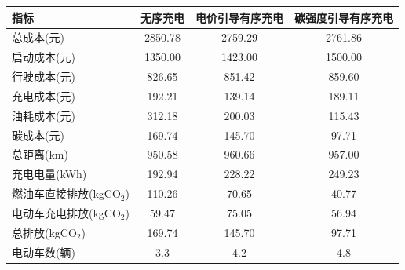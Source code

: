   \begin{tabular*}{\textwidth}{@{\extracolsep{\fill}}lccc@{}}
    \toprule
    指标 & 无序充电 & 电价引导有序充电 & 碳强度引导有序充电\\
    \midrule
    总成本(元) & 2850.78 & 2759.29 & 2761.86\\
    启动成本(元) & 1350.00 & 1423.00 & 1500.00\\
    行驶成本(元) & 826.65 & 851.42 & 859.60\\
    充电成本(元) & 192.21 & 139.14 & 189.11\\
    油耗成本(元) & 312.18 & 200.03 & 115.43\\
    碳成本(元) & 169.74 & 145.70 & 97.71\\
    总距离(km) & 950.58 & 960.66 & 957.00\\
    充电电量(kWh) & 192.94 & 228.22 & 249.23\\
    燃油车直接排放(kgCO$_2$) & 110.26 & 70.65 & 40.77\\
    电动车充电排放(kgCO$_2$) & 59.47 & 75.05 & 56.94\\
    总排放(kgCO$_2$) & 169.74 & 145.70 & 97.71\\
    电动车数(辆) & 3.3 & 4.2 & 4.8\\
    \bottomrule
  \end{tabular*}
